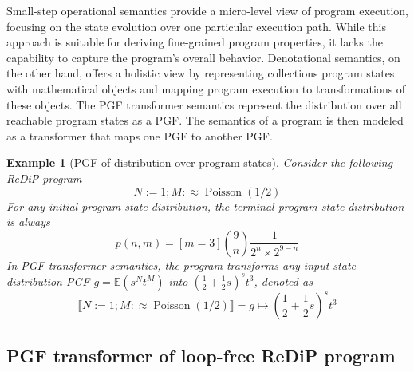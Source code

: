 \documentclass[a4paper]{article}
\renewcommand{\S}[1]{ \llbracket #1 \rrbracket }
\newcommand{\E}{ \mathbb{E} }
\newtheorem{example}[theorem]{Example}
\begin{document}
Small-step operational semantics provide a micro-level view of program execution, focusing on the state evolution over one particular execution path. While this approach is suitable for deriving fine-grained program properties, it lacks the capability to capture the program's overall behavior.
Denotational semantics, on the other hand, offers a holistic view by representing collections program states with mathematical objects and mapping program execution to transformations of these objects.
The PGF transformer semantics represent the distribution over all reachable program states as a PGF. The semantics of a program is then modeled as a transformer that maps one PGF to another PGF.

\begin{example}[PGF of distribution over program states]
	Consider the following ReDiP program
	\[
		N := 1; M :\approx \operatorname{Poisson}(1/2)
	\]
	For any initial program state distribution, the terminal program state distribution is always
	\[
		p(n,m) = [m=3] \binom{9}{n}\frac{1}{2^n \times 2^{9-n}}
	\]
	In PGF transformer semantics, the program transforms any input state distribution PGF \(g=\E(s^N t^M)\) into \({\left( \frac12 + \frac12 s \right)}^s t^3\), denoted as
	\[
		\S{N := 1; M :\approx \operatorname{Poisson}(1/2)}
		= g\mapsto {\left( \frac12 + \frac12 s \right)}^s t^3
	\]
\end{example}

\subsection{PGF transformer of loop-free ReDiP program}
\end{document}
